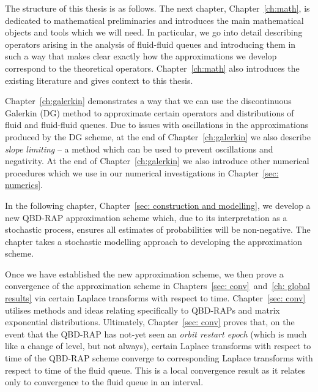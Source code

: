 The structure of this thesis is as follows. The next chapter, Chapter~\ref{ch:math}, is dedicated to mathematical preliminaries and introduces the main mathematical objects and tools which we will need. In particular, we go into detail describing operators arising in the analysis of fluid-fluid queues and introducing them in such a way that makes clear exactly how the approximations we develop correspond to the theoretical operators. Chapter~\ref{ch:math} also introduces the existing literature and gives context to this thesis.

Chapter~\ref{ch:galerkin} demonstrates a way that we can use the discontinuous Galerkin (DG) method to approximate certain operators and distributions of fluid and fluid-fluid queues. Due to issues with oscillations in the approximations produced by the DG scheme, at the end of Chapter~\ref{ch:galerkin} we also describe \emph{slope limiting} -- a method which can be used to prevent oscillations and negativity. At the end of Chapter~\ref{ch:galerkin} we also introduce other numerical procedures which we use in our numerical investigations in Chapter~\ref{sec: numerics}.

In the following chapter, Chapter~\ref{sec: construction and modelling}, we develop a new QBD-RAP approximation scheme which, due to its interpretation as a stochastic process, ensures all estimates of probabilities will be non-negative. The chapter takes a stochastic modelling approach to developing the approximation scheme. 

Once we have established the new approximation scheme, we then prove a convergence of the approximation scheme in Chapters~\ref{sec: conv}~and~\ref{ch: global results} via certain Laplace transforms with respect to time. Chapter~\ref{sec: conv} utilises methods and ideas relating specifically to QBD-RAPs and matrix exponential distributions. Ultimately, Chapter~\ref{sec: conv} proves that, on the event that the QBD-RAP has not-yet seen an \emph{orbit restart epoch} (which is much like a change of level, but not always), certain Laplace transforms with respect to time of the QBD-RAP scheme converge to corresponding Laplace transforms with respect to time of the fluid queue. This is a local convergence result as it relates only to convergence to the fluid queue in an interval. 

